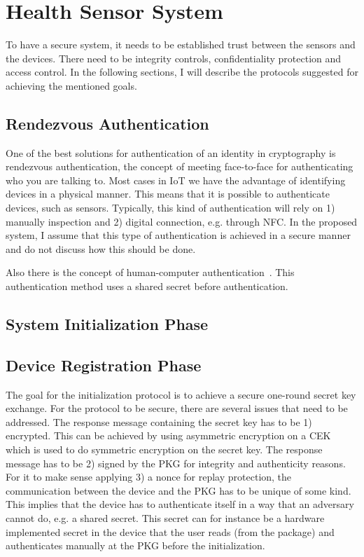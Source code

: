 \section{Health Sensor System}\label{hss}
To have a secure system, it needs to be established trust between the sensors and the devices.
There need to be integrity controls, confidentiality protection and access control. 
In the following sections, I will describe the protocols suggested for achieving the mentioned goals.

\subsection{Rendezvous Authentication}\label{rendezvous_authentication}
One of the best solutions for authentication of an identity in cryptography is rendezvous authentication, the concept of meeting face-to-face for authenticating who you are talking to. 
Most cases in \gls{IoT} we have the advantage of identifying devices in a physical manner.
This means that it is possible to authenticate devices, such as sensors. 
Typically, this kind of authentication will rely on 1) manually inspection and 2) digital connection, e.g. through \gls{NFC}.
In the proposed system, I assume that this type of authentication is achieved in a secure manner and do not discuss how this should be done.

Also there is the concept of human-computer authentication~\cite{DBLP:journals/iacr/GilbertRS05, DBLP:conf/crypto/JuelsW05, DBLP:conf/percom/Weis05}.
This authentication method uses a shared secret before authentication. 

\subsection{System Initialization Phase}

\subsection{Device Registration Phase}\label{init}
The goal for the initialization protocol is to achieve a secure one-round secret key exchange.
For the protocol to be secure, there are several issues that need to be addressed. 
The response message containing the secret key has to be 1) encrypted. 
This can be achieved by using asymmetric encryption on a \gls{CEK} which is used to do symmetric encryption on the secret key.
The response message has to be 2) signed by the \gls{PKG} for integrity and authenticity reasons.
For it to make sense applying 3) a nonce for replay protection, the communication between the device and the \gls{PKG} has to be unique of some kind.
This implies that the device has to authenticate itself in a way that an adversary cannot do, e.g. a shared secret.
This secret can for instance be a hardware implemented secret in the device that the user reads (from the package) and authenticates manually at the \gls{PKG} before the initialization.

